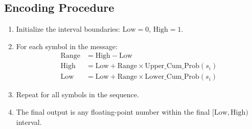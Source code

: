 \documentclass[12pt,a4paper]{article}
\begin{document}
\subsection{Encoding Procedure}
\begin{enumerate}[label=\textbf{Step \arabic*:}, leftmargin=4.5em, itemsep=2pt, topsep=1pt]
  \item Initialize the interval boundaries: $\text{Low} = 0$, $\text{High} = 1$.
  \item For each symbol in the message:
    \begin{align}
      \text{Range} &= \text{High} - \text{Low} \\
      \text{High} &= \text{Low} + \text{Range} \times \text{Upper\_Cum\_Prob}(s_i) \\
      \text{Low} &= \text{Low} + \text{Range} \times \text{Lower\_Cum\_Prob}(s_i)
    \end{align}
  \item Repeat for all symbols in the sequence.
  \item The final output is any floating-point number within the final $[\text{Low}, \text{High})$ interval.
\end{enumerate}
\end{document}

